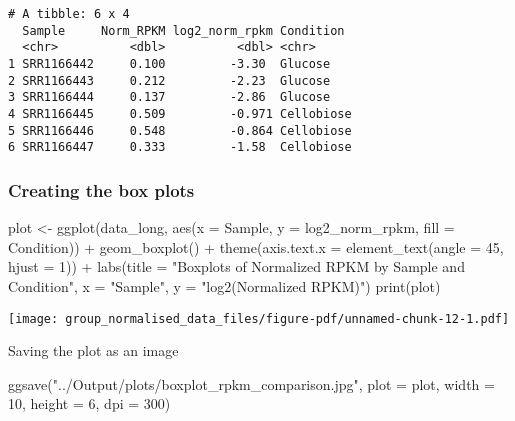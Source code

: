 \documentclass[
  letterpaper,
  DIV=11,
  numbers=noendperiod]{scrartcl}
\newenvironment{Shaded}{\begin{snugshade}}{\end{snugshade}}
\newcommand{\AttributeTok}[1]{\textcolor[rgb]{0.40,0.45,0.13}{#1}}
\newcommand{\DecValTok}[1]{\textcolor[rgb]{0.68,0.00,0.00}{#1}}
\newcommand{\FunctionTok}[1]{\textcolor[rgb]{0.28,0.35,0.67}{#1}}
\newcommand{\NormalTok}[1]{\textcolor[rgb]{0.00,0.23,0.31}{#1}}
\newcommand{\OtherTok}[1]{\textcolor[rgb]{0.00,0.23,0.31}{#1}}
\newcommand{\SpecialCharTok}[1]{\textcolor[rgb]{0.37,0.37,0.37}{#1}}
\newcommand{\StringTok}[1]{\textcolor[rgb]{0.13,0.47,0.30}{#1}}
\begin{document}
\begin{verbatim}
# A tibble: 6 x 4
  Sample     Norm_RPKM log2_norm_rpkm Condition 
  <chr>          <dbl>          <dbl> <chr>     
1 SRR1166442     0.100         -3.30  Glucose   
2 SRR1166443     0.212         -2.23  Glucose   
3 SRR1166444     0.137         -2.86  Glucose   
4 SRR1166445     0.509         -0.971 Cellobiose
5 SRR1166446     0.548         -0.864 Cellobiose
6 SRR1166447     0.333         -1.58  Cellobiose
\end{verbatim}

\subsubsection{Creating the box plots}\label{creating-the-box-plots}

\begin{Shaded}
\begin{Highlighting}[]
\NormalTok{plot }\OtherTok{\textless{}{-}} \FunctionTok{ggplot}\NormalTok{(data\_long, }\FunctionTok{aes}\NormalTok{(}\AttributeTok{x =}\NormalTok{ Sample, }\AttributeTok{y =}\NormalTok{ log2\_norm\_rpkm, }\AttributeTok{fill =}\NormalTok{ Condition)) }\SpecialCharTok{+}
  \FunctionTok{geom\_boxplot}\NormalTok{() }\SpecialCharTok{+}
  \FunctionTok{theme}\NormalTok{(}\AttributeTok{axis.text.x =} \FunctionTok{element\_text}\NormalTok{(}\AttributeTok{angle =} \DecValTok{45}\NormalTok{, }\AttributeTok{hjust =} \DecValTok{1}\NormalTok{)) }\SpecialCharTok{+}
  \FunctionTok{labs}\NormalTok{(}\AttributeTok{title =} \StringTok{"Boxplots of Normalized RPKM by Sample and Condition"}\NormalTok{, }
       \AttributeTok{x =} \StringTok{"Sample"}\NormalTok{, }\AttributeTok{y =} \StringTok{"log2(Normalized RPKM)"}\NormalTok{)}
\FunctionTok{print}\NormalTok{(plot)}
\end{Highlighting}
\end{Shaded}

\texttt{[image: group\_normalised\_data\_files/figure-pdf/unnamed-chunk-12-1.pdf]}

Saving the plot as an image

\begin{Shaded}
\begin{Highlighting}[]
\FunctionTok{ggsave}\NormalTok{(}\StringTok{"../Output/plots/boxplot\_rpkm\_comparison.jpg"}\NormalTok{, }
       \AttributeTok{plot =}\NormalTok{ plot, }\AttributeTok{width =} \DecValTok{10}\NormalTok{, }\AttributeTok{height =} \DecValTok{6}\NormalTok{, }\AttributeTok{dpi =} \DecValTok{300}\NormalTok{)}
\end{Highlighting}
\end{Shaded}
\end{document}
